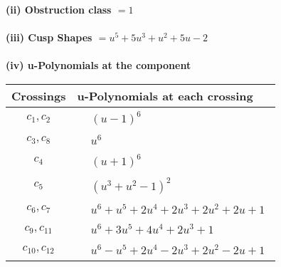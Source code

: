 \documentclass[1p]{elsarticle_modified}
\theoremstyle{definition}
\begin{document}
\flushleft \textbf{(ii) Obstruction class $= 1$}\\~\\
\flushleft \textbf{(iii) Cusp Shapes $= u^5+5 u^3+u^2+5 u-2$}\\~\\
\newpage\renewcommand{\arraystretch}{1}
\flushleft \textbf{(iv) u-Polynomials at the component}\newline \\
\begin{tabular}{m{50pt}|m{274pt}}
Crossings & \hspace{64pt}u-Polynomials at each crossing \\
\hline $$\begin{aligned}c_{1},c_{2}\end{aligned}$$&$\begin{aligned}
&(u-1)^6
\end{aligned}$\\
\hline $$\begin{aligned}c_{3},c_{8}\end{aligned}$$&$\begin{aligned}
&u^6
\end{aligned}$\\
\hline $$\begin{aligned}c_{4}\end{aligned}$$&$\begin{aligned}
&(u+1)^6
\end{aligned}$\\
\hline $$\begin{aligned}c_{5}\end{aligned}$$&$\begin{aligned}
&(u^3+u^2-1)^2
\end{aligned}$\\
\hline $$\begin{aligned}c_{6},c_{7}\end{aligned}$$&$\begin{aligned}
&u^6+u^5+2 u^4+2 u^3+2 u^2+2 u+1
\end{aligned}$\\
\hline $$\begin{aligned}c_{9},c_{11}\end{aligned}$$&$\begin{aligned}
&u^6+3 u^5+4 u^4+2 u^3+1
\end{aligned}$\\
\hline $$\begin{aligned}c_{10},c_{12}\end{aligned}$$&$\begin{aligned}
&u^6- u^5+2 u^4-2 u^3+2 u^2-2 u+1
\end{aligned}$\\
\hline
\end{tabular}\\~\\
\end{document}
